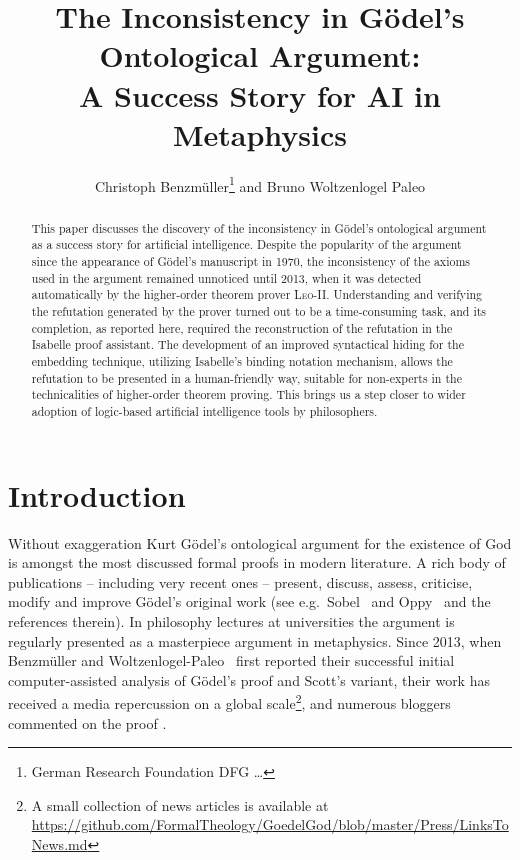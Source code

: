 \documentclass{article}
\title{The Inconsistency in G\"odel's Ontological Argument: \\ A Success Story for AI in Metaphysics}
\author{Christoph Benzm\"uller\thanks{German Research Foundation DFG \ldots} and Bruno Woltzenlogel Paleo}
\author{}
\begin{document}
\maketitle

\begin{abstract}
  This paper discusses the discovery of the inconsistency in G\"odel's ontological argument as a success story for artificial intelligence. Despite the popularity of the argument since the appearance of G\"odel's manuscript in 1970, the inconsistency of the axioms used in the argument remained unnoticed until 2013, when it was detected automatically by the higher-order theorem prover \textsc{Leo-II}. Understanding and verifying the refutation generated by the prover turned out to be a time-consuming task, and its completion, as reported here, required the reconstruction of the refutation in the Isabelle proof assistant. The development of an improved syntactical hiding for the embedding technique, utilizing Isabelle's binding notation mechanism, allows the refutation to be presented in a human-friendly way, suitable for non-experts in the technicalities of higher-order theorem proving. This brings us a step closer to wider adoption of logic-based artificial intelligence tools by philosophers.
\end{abstract}


\section{Introduction}\label{sec:introduction}
Without exaggeration Kurt G\"{o}del's ontological
argument for the existence of God \cite{GoedelNotes,ScottNotes} is
amongst the most discussed formal proofs in modern literature. A rich
body of publications -- including very recent ones -- present,
discuss, assess, criticise, modify and improve G\"{o}del's original
work (see e.g.~Sobel~ and Oppy~ and the
references therein).  In philosophy lectures at universities the
argument is regularly presented as a masterpiece argument in
metaphysics. Since 2013, when Benzm\"uller and Woltzenlogel-Paleo~ first
reported their successful initial computer-assisted
analysis of G\"odel's proof and Scott's variant,
their work has received a media repercussion on a global scale\footnote{A
  small collection of news articles is available at {\scriptsize
    \url{https://github.com/FormalTheology/GoedelGod/blob/master/Press/LinksToNews.md}}},
and numerous bloggers commented on the proof
\cite{fuhrmann15:_blogg_goedel}.
\end{document}
